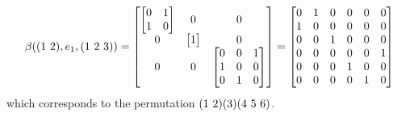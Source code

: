 \begin{example}
\begin{remark}
  \[
  \beta(( 1 \, \, 2 ),e_1,(1 \,\, 2 \,\, 3)) =
  \begin{bmatrix}
  \begin{bmatrix}
  0 & 1 \\
  1 & 0
  \end{bmatrix} & 0 & 0 \\
  0 & \begin{bmatrix} 1 \end{bmatrix} & 0 \\
  0 & 0 &   \begin{bmatrix}
  0 & 0 & 1 \\
  1 & 0 & 0 \\
  0 & 1 & 0
  \end{bmatrix}
  \end{bmatrix}
  =
  \begin{bmatrix}
  0 & 1 & 0 & 0 & 0 & 0 \\
  1 & 0 & 0 & 0 & 0 & 0 \\
  0 & 0 & 1 & 0 & 0 & 0 \\
  0 & 0 & 0 & 0 & 0 & 1 \\
  0 & 0 & 0 & 1 & 0 & 0 \\
  0 & 0 & 0 & 0 & 1 & 0 \\
  \end{bmatrix}
  \]
which corresponds to the permutation $( 1 \, \, 2 )(3)(4 \,\, 5 \,\, 6)$.


\end{remark}
\end{example}
